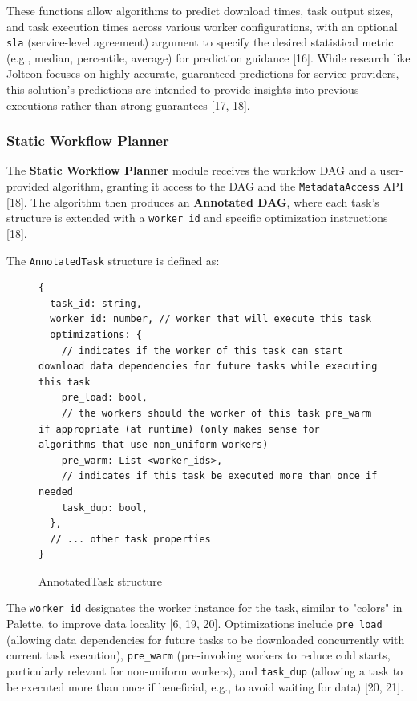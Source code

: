 \documentclass[conference]{IEEEtran}
\begin{document}
These functions allow algorithms to predict download times, task output sizes, and task execution times across various worker configurations, with an optional \texttt{sla} (service-level agreement) argument to specify the desired statistical metric (e.g., median, percentile, average) for prediction guidance [16]. While research like Jolteon focuses on highly accurate, guaranteed predictions for service providers, this solution's predictions are intended to provide insights into previous executions rather than strong guarantees [17, 18].

\subsubsection{Static Workflow Planner}
The \textbf{Static Workflow Planner} module receives the workflow DAG and a user-provided algorithm, granting it access to the DAG and the \texttt{MetadataAccess} API [18]. The algorithm then produces an \textbf{Annotated DAG}, where each task's structure is extended with a \texttt{worker\_id} and specific optimization instructions [18].

The \texttt{AnnotatedTask} structure is defined as:
\begin{figure}[h]
\centering
\begin{lstlisting}[basicstyle=\ttfamily\footnotesize, columns=fullflexible, breaklines=true]
{
  task_id: string,
  worker_id: number, // worker that will execute this task
  optimizations: {
    // indicates if the worker of this task can start download data dependencies for future tasks while executing this task
    pre_load: bool,
    // the workers should the worker of this task pre_warm if appropriate (at runtime) (only makes sense for algorithms that use non_uniform workers)
    pre_warm: List <worker_ids>,
    // indicates if this task be executed more than once if needed
    task_dup: bool,
  },
  // ... other task properties
}
\end{lstlisting}
\caption{AnnotatedTask structure}
\label{lst:annotated_task}
\end{figure}

The \texttt{worker\_id} designates the worker instance for the task, similar to "colors" in Palette, to improve data locality [6, 19, 20]. Optimizations include \texttt{pre\_load} (allowing data dependencies for future tasks to be downloaded concurrently with current task execution), \texttt{pre\_warm} (pre-invoking workers to reduce cold starts, particularly relevant for non-uniform workers), and \texttt{task\_dup} (allowing a task to be executed more than once if beneficial, e.g., to avoid waiting for data) [20, 21].
\end{document}
